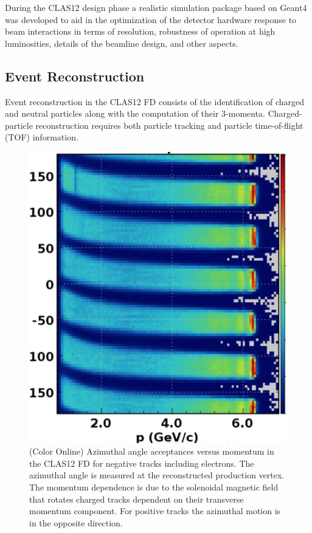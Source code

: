 \documentclass[final,3p,twocolumn]{elsarticle}
\begin{document}
During the CLAS12 design phase a realistic simulation package based on Geant4 was developed to aid in the optimization 
of the detector hardware response to beam interactions in terms of resolution, robustness of operation at high
luminosities, details of the beamline design, and other aspects. 

\subsection{Event Reconstruction} 

Event reconstruction in the CLAS12 FD consists of the identification of charged and neutral particles along with the 
computation of their 3-momenta. Charged-particle reconstruction requires both particle tracking and particle 
time-of-flight (TOF) information. 

\begin{figure}[htbp!]
\centerline {
\includegraphics[width=0.9\columnwidth]{neg-tracks.png}}
\caption{(Color Online) Azimuthal angle acceptances versus momentum in the CLAS12 FD for negative tracks 
including electrons. The azimuthal angle is measured at the reconstructed production vertex. The momentum dependence 
is due to the solenoidal magnetic field that rotates charged tracks dependent on their transverse momentum component. 
For positive tracks the azimuthal motion is in the opposite direction.
} 
\label{neg-tracks}
\end{figure}
\end{document}
